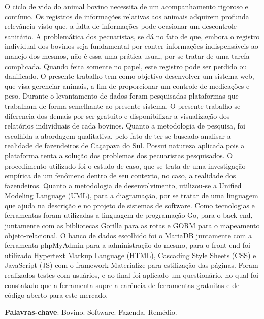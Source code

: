 %
%

\begin{RESUMO}
\thispagestyle{empty}
	\begin{SingleSpace}

		\hspace{-1.2 cm}  O ciclo de vida do animal bovino necessita de um acompanhamento rigoroso e contínuo. Os registros de informações relativas aos animais adquirem profunda relevância visto que, a falta de informações pode ocasionar um descontrole sanitário. A problemática dos pecuaristas, se dá no fato de que, embora o registro individual dos bovinos seja fundamental por conter informações indispensáveis ao manejo dos mesmos, não é essa uma prática usual, por se tratar de uma tarefa  complicada. Quando feita somente no papel, este registro pode ser perdido ou danificado. O presente trabalho tem como objetivo desenvolver um sistema web, que visa gerenciar animais, a fim de proporcionar um controle de medicações e peso. Durante o levantamento de dados foram pesquisadas plataformas que trabalham de forma semelhante ao presente sistema. O presente trabalho se diferencia dos demais por ser gratuito e disponibilizar a visualização dos relatórios individuais de cada bovinos. Quanto a metodologia de pesquisa, foi escolhida a abordagem qualitativa, pelo fato de ter-se buscado analisar a realidade de fazendeiros de Caçapava do Sul. Possui natureza aplicada pois a plataforma tenta a solução dos problemas dos pecuaristas pesquisados. O procedimento utilizado foi o estudo de caso, que se trata de uma investigação empírica de um fenômeno dentro de seu contexto, no caso, a realidade dos fazendeiros. Quanto a metodologia de desenvolvimento, utilizou-se a Unified Modeling Language (UML), para a diagramação, por se tratar de uma linguagem que ajuda na descrição e no projeto de sistemas de software. Como tecnologias e ferramentas foram utilizadas a linguagem de programação Go, para o back-end, juntamente com as bibliotecas Gorilla para as rotas e GORM para o mapeamento objeto-relacional. O banco de dados escolhido foi o MariaDB juntamente com a ferramenta phpMyAdmin para a administração do mesmo, para o front-end foi utilizado Hypertext Markup Language (HTML), Cascading Style Sheets (CSS) e JavaScript (JS) com o framework Materialize para estilização das páginas. Foram realizados testes com usuários, e ao final foi aplicado um questionário, no qual foi constatado que a ferramenta supre a carência de ferramentas gratuitas e de código aberto para este mercado.

		\vspace*{0.5cm}\hspace{-1.3 cm}\textbf{Palavras-chave}: Bovino. Software. Fazenda. Remédio.

	\end{SingleSpace}

\end{RESUMO}

